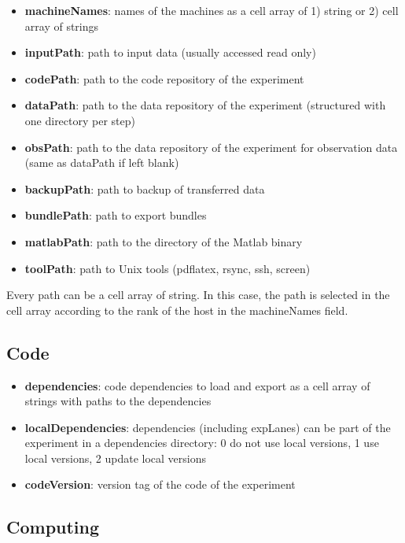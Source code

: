\documentclass[a4paper,fleqn]{tufte-handout}
\begin{document}
\begin{itemize}
\item \textbf{machineNames}: names of the machines as a cell array of 1) string or 2) cell array of strings
\item \textbf{inputPath}: path to input data (usually accessed read only)
\item \textbf{codePath}: path to the code repository of the experiment
\item \textbf{dataPath}: path to the data repository of the experiment  (structured with one directory per step)
\item \textbf{obsPath}: path to the data repository of the experiment for observation data (same as dataPath if left blank)
\item \textbf{backupPath}: path to backup of transferred data
\item \textbf{bundlePath}: path to export bundles
\item \textbf{matlabPath}: path to the directory of the Matlab binary 
\item \textbf{toolPath}: path to Unix tools (pdflatex, rsync, ssh, screen)
\end{itemize}

Every path can be a cell array of string. In this case, the path is selected in the cell array according to the rank of the host in the machineNames field.

\subsection{Code}

\begin{itemize}
\item \textbf{dependencies}: code dependencies to load and export as a cell array of strings with paths to the dependencies
\item \textbf{localDependencies}: dependencies (including expLanes) can be part of the experiment in a dependencies directory: 0 do not use local versions, 1 use local versions, 2 update local versions
\item \textbf{codeVersion}: version tag of the code of the experiment
\end{itemize}

\subsection{Computing}
\end{document}
